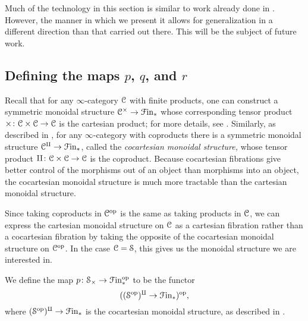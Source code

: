 \documentclass[main.tex]{subfiles}
\begin{document}
Much of the technology in this section is similar to work already done in \cite{spectralmackeyfunctors2}. However, the manner in which we present it allows for generalization in a different direction than that carried out there. This will be the subject of future work.

\subsection{Defining the maps \texorpdfstring{$p$}{p}, \texorpdfstring{$q$}{q}, and \texorpdfstring{$r$}{r}}
\label{ssc:defining_the_maps_p_q_and_r}

Recall that for any $\infty$-category $\mathcal{C}$ with finite products, one can construct a symmetric monoidal structure $\mathcal{C}^{\times} \to \mathcal{F}\mathrm{in}_{*}$ whose corresponding tensor product $\times\colon \mathcal{C} \times \mathcal{C} \to \mathcal{C}$ is the cartesian product; for more details, see \cite[Sec.\ 2.4.1]{luriehigheralgebra}. Similarly, as described in \cite[Sec.\ 2.4.2]{luriehigheralgebra}, for any $\infty$-category with coproducts there is a symmetric monoidal structure $\mathcal{C}^{\amalg} \to \mathcal{F}\mathrm{in}_{*}$, called the \emph{cocartesian monoidal structure,} whose tensor product $\amalg\colon \mathcal{C} \times \mathcal{C} \to \mathcal{C}$ is the coproduct. Because cocartesian fibrations give better control of the morphisms out of an object than morphisms into an object, the cocartesian monoidal structure is much more tractable than the cartesian monoidal structure.

Since taking coproducts in $\mathcal{C}^{\mathrm{op}}$ is the same as taking products in $\mathcal{C}$, we can express the cartesian monoidal structure on $\mathcal{C}$ as a cartesian fibration rather than a cocartesian fibration by taking the opposite of the cocartesian monoidal structure on $\mathcal{C}^{\mathrm{op}}$. In the case $\mathcal{C} = \mathcal{S}$, this gives us the monoidal structure we are interested in.

\begin{definition}
  We define the map $p\colon \mathcal{S}_{\times} \to \mathcal{F}\mathrm{in}_{*}^{\mathrm{op}}$ to be the functor
  \begin{equation*}
    ((\mathcal{S}^{\mathrm{op}})^{\amalg} \to \mathcal{F}\mathrm{in}_{*})^{\mathrm{op}},
  \end{equation*}
  where $(\mathcal{S}^{\mathrm{op}})^{\amalg} \to \mathcal{F}\mathrm{in}_{*}$ is the cocartesian monoidal structure, as described in \cite[Sec.\ 2.4.2]{luriehigheralgebra}.
\end{definition}
\end{document}
